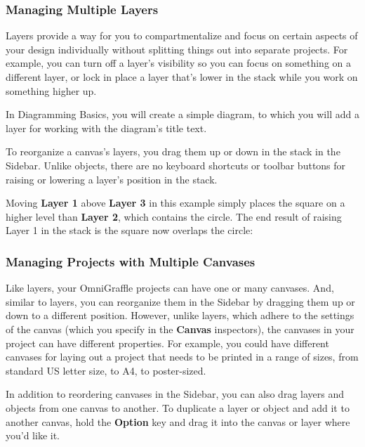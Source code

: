 \documentclass[../main.tex]{subfiles}
\begin{document}
\subsubsection{Managing Multiple Layers}
Layers provide a way for you to compartmentalize and focus on certain aspects of your design
individually
without splitting things out into separate projects. For example, you can turn off a layer's
visibility so
you can focus on something on a different layer, or lock in place a layer that's lower in the
stack while you
work on something higher up.

\begin{ognote}
  In Diagramming Basics, you will create a simple diagram, to which you will add a layer for
  working with the
  diagram's title text.
\end{ognote}
To reorganize a canvas's layers, you drag them up or down in the stack in the Sidebar. Unlike
objects, there
are no keyboard shortcuts or toolbar buttons for raising or lowering a layer's position in the
stack.


Moving \textbf{Layer 1} above \textbf{Layer 3} in this example simply places the square on a
higher level
than \textbf{Layer 2}, which contains the circle. The end result of raising Layer 1 in the stack
is the
square now overlaps the circle:

\subsubsection{Managing Projects with Multiple Canvases}
Like layers, your OmniGraffle projects can have one or many canvases. And, similar to layers,
you can
reorganize them in the Sidebar by dragging them up or down to a different position.
However, unlike layers, which adhere to the settings of the canvas (which you specify in the
  \textbf{Canvas}
inspectors), the canvases in your project can have different properties. For example, you could
have
different canvases for laying out a project that needs to be printed in a range of sizes, from
standard US
letter size, to A4, to poster-sized.

In addition to reordering canvases in the Sidebar, you can also drag layers and objects from one
canvas to
another. To duplicate a layer or object and add it to another canvas, hold the \textbf{Option}
key and drag
it into the canvas or layer where you'd like it.
\end{document}
